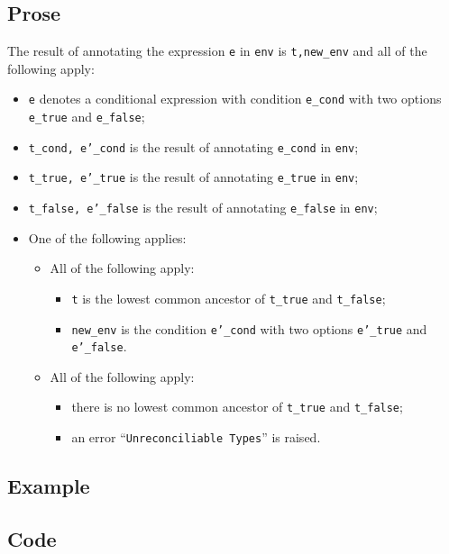 \documentclass{book}
\begin{document}
  \subsection{Prose}
  The result of annotating the expression \texttt{e} in \texttt{env} is
\texttt{t,new\_env} and all of the following apply:
  \begin{itemize}
  \item \texttt{e} denotes a conditional expression with condition \texttt{e\_cond} with two options \texttt{e\_true} and \texttt{e\_false};
  \item \texttt{t\_cond, e'\_cond} is the result of annotating \texttt{e\_cond} in \texttt{env};
  \item \texttt{t\_true, e'\_true} is the result of annotating \texttt{e\_true} in \texttt{env};
  \item \texttt{t\_false, e'\_false} is the result of annotating \texttt{e\_false} in \texttt{env};
  \item One of the following applies:
    \begin{itemize}
    \item All of the following apply:
      \begin{itemize}
      \item \texttt{t} is the lowest common ancestor of \texttt{t\_true} and \texttt{t\_false};
      \item \texttt{new\_env} is the condition \texttt{e'\_cond} with two options \texttt{e'\_true} and \texttt{e'\_false}.
      \end{itemize}
    \item All of the following apply:
      \begin{itemize}
      \item there is no lowest common ancestor of \texttt{t\_true} and \texttt{t\_false};
      \item an error ``\texttt{Unreconciliable Types}'' is raised.
      \end{itemize}
    \end{itemize}
  \end{itemize}

  \subsection{Example}

  \subsection{Code}
\end{document}
